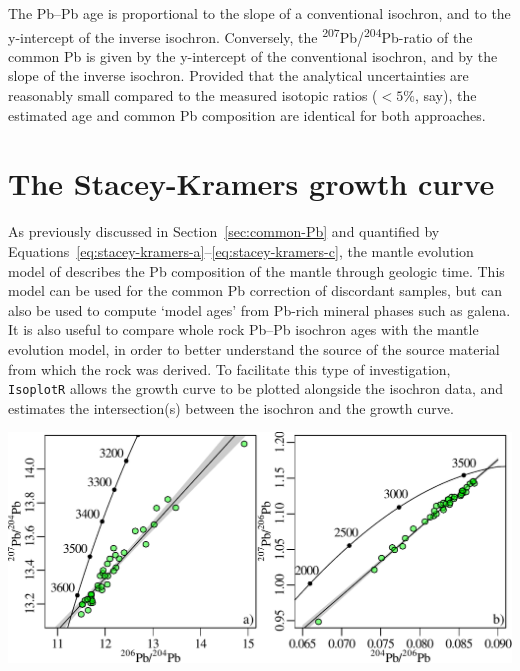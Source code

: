 \begin{refsection}
The Pb--Pb age is proportional to the slope of a conventional
isochron, and to the y-intercept of the inverse isochron. Conversely,
the \textsuperscript{207}Pb/\textsuperscript{204}Pb-ratio of the
common Pb is given by the y-intercept of the conventional isochron,
and by the slope of the inverse isochron. Provided that the analytical
uncertainties are reasonably small compared to the measured isotopic
ratios ($<5\%$, say), the estimated age and common Pb composition are
identical for both approaches.

\section{The Stacey-Kramers growth curve}\label{sec:SKgrowth}

As previously discussed in Section~\ref{sec:common-Pb} and quantified
by Equations~\ref{eq:stacey-kramers-a}--\ref{eq:stacey-kramers-c}, the
mantle evolution model of \citet{stacey1975} describes the Pb
composition of the mantle through geologic time. This model can be
used for the common Pb correction of discordant samples, but can also
be used to compute `model ages' from Pb-rich mineral phases such as
galena. It is also useful to compare whole rock Pb--Pb isochron ages
with the mantle evolution model, in order to better understand the
source of the source material from which the rock was derived.  To
facilitate this type of investigation, \texttt{IsoplotR} allows the
\citet{stacey1975} growth curve to be plotted alongside the isochron
data, and estimates the intersection(s) between the isochron and the
growth curve.

\begin{center}
\noindent\includegraphics[width=.8\linewidth]{../figures/Kamber.pdf}
\label{fig:Kamber}
\end{center}


\end{refsection}
